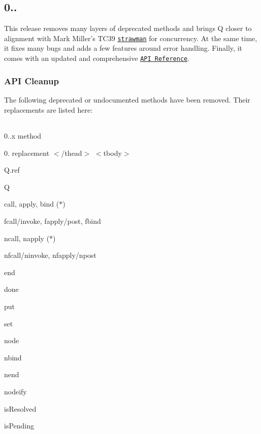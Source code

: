 \subsection*{0..}

This release removes many layers of deprecated methods and brings Q closer to alignment with Mark Miller’s T\+C39 \href{http://wiki.ecmascript.org/doku.php?id=strawman:concurrency}{\tt strawman} for concurrency. At the same time, it fixes many bugs and adds a few features around error handling. Finally, it comes with an updated and comprehensive \href{https://github.com/kriskowal/q/wiki/API-Reference}{\tt A\+PI Reference}.

\subsubsection*{A\+PI Cleanup}

The following deprecated or undocumented methods have been removed. Their replacements are listed here\+:

\tabulinesep=1mm
\begin{longtabu} spread 0pt [c]{*{0}{|X[-1]}|}
\hline
\end{longtabu}


0..\+x method 

0. replacement  $<$/thead$>$ $<$tbody$>$ 

{\ttfamily Q.\+ref} 

{\ttfamily Q}  

{\ttfamily call}, {\ttfamily apply}, {\ttfamily bind} ($\ast$) 

{\ttfamily fcall}/{\ttfamily invoke}, {\ttfamily fapply}/{\ttfamily post}, {\ttfamily fbind}  

{\ttfamily ncall}, {\ttfamily napply} ($\ast$) 

{\ttfamily nfcall}/{\ttfamily ninvoke}, {\ttfamily nfapply}/{\ttfamily npost}  

{\ttfamily end} 

{\ttfamily done}  

{\ttfamily put} 

{\ttfamily set}  

{\ttfamily node} 

{\ttfamily nbind}  

{\ttfamily nend} 

{\ttfamily nodeify}  

{\ttfamily is\+Resolved} 

{\ttfamily is\+Pending}  

